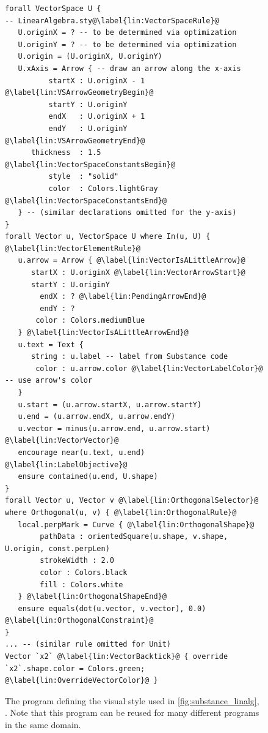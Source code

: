 \begin{figure}[p]
\begin{mdframed}[style=STYCode]
\begin{lstlisting}[language=Sty-LA,escapechar=@]
forall VectorSpace U {                                      -- LinearAlgebra.sty@\label{lin:VectorSpaceRule}@
   U.originX = ? -- to be determined via optimization
   U.originY = ? -- to be determined via optimization
   U.origin = (U.originX, U.originY)
   U.xAxis = Arrow { -- draw an arrow along the x-axis
          startX : U.originX - 1 @\label{lin:VSArrowGeometryBegin}@
          startY : U.originY
          endX   : U.originX + 1
          endY   : U.originY @\label{lin:VSArrowGeometryEnd}@
      thickness  : 1.5 @\label{lin:VectorSpaceConstantsBegin}@
          style  : "solid"
          color  : Colors.lightGray @\label{lin:VectorSpaceConstantsEnd}@
   } -- (similar declarations omitted for the y-axis)
}
forall Vector u, VectorSpace U where In(u, U) { @\label{lin:VectorElementRule}@            
   u.arrow = Arrow { @\label{lin:VectorIsALittleArrow}@
      startX : U.originX @\label{lin:VectorArrowStart}@
      startY : U.originY
        endX : ? @\label{lin:PendingArrowEnd}@
        endY : ?
       color : Colors.mediumBlue
   } @\label{lin:VectorIsALittleArrowEnd}@
   u.text = Text {
      string : u.label -- label from Substance code
       color : u.arrow.color @\label{lin:VectorLabelColor}@ -- use arrow's color
   }
   u.start = (u.arrow.startX, u.arrow.startY)
   u.end = (u.arrow.endX, u.arrow.endY)
   u.vector = minus(u.arrow.end, u.arrow.start) @\label{lin:VectorVector}@
   encourage near(u.text, u.end) @\label{lin:LabelObjective}@
   ensure contained(u.end, U.shape)
}
forall Vector u, Vector v @\label{lin:OrthogonalSelector}@
where Orthogonal(u, v) { @\label{lin:OrthogonalRule}@
   local.perpMark = Curve { @\label{lin:OrthogonalShape}@
        pathData : orientedSquare(u.shape, v.shape, U.origin, const.perpLen)
        strokeWidth : 2.0
        color : Colors.black
        fill : Colors.white
   } @\label{lin:OrthogonalShapeEnd}@
   ensure equals(dot(u.vector, v.vector), 0.0) @\label{lin:OrthogonalConstraint}@
}
... -- (similar rule omitted for Unit)
Vector `x2` @\label{lin:VectorBacktick}@ { override `x2`.shape.color = Colors.green; @\label{lin:OverrideVectorColor}@ }
\end{lstlisting}
\end{mdframed}
   \vspace{-.5\baselineskip}\caption{The \Style{} program defining the visual style used in \cref{fig:substance_linalg}, . Note that this \Style{} program can be reused for many different \Substance{} programs in the same domain.\label{fig:style_linalg}}
   
\end{figure}

